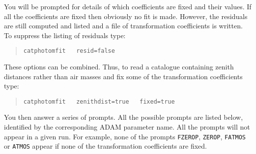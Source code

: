 \documentclass[twoside,11pt]{article}
\renewcommand{\_}{\texttt{\symbol{95}}}
\begin{document}
You will be prompted for details of which coefficients are fixed and
their values.  If all the coefficients are fixed then obviously no fit
is made.  However, the residuals are still computed and listed and a
file of transformation coefficients is written.  To suppress the listing
of residuals type:

\begin{verse}
{\tt catphotomfit ~ resid=false}
\end{verse}

These options can be combined.  Thus, to read a catalogue containing
zenith distances rather than air masses and fix some of the
transformation coefficients type:

\begin{verse}
{\tt catphotomfit ~ zenithdist=true ~ fixed=true}
\end{verse}

You then answer a series of prompts.  All the possible prompts are
listed below, identified by the corresponding ADAM parameter name.  All
the prompts will not appear in a given run.  For example, none of
the prompts {\tt FZEROP}, {\tt ZEROP}, {\tt FATMOS} or {\tt ATMOS}
appear if none of the transformation coefficients are fixed.
\end{document}
